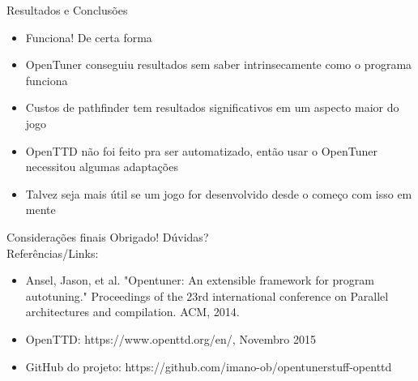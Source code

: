 \documentclass[10pt]{beamer}
\begin{document}
\begin{frame}{Resultados e Conclusões}
	\begin{itemize}
	\item Funciona!  De certa forma\\
	\item OpenTuner conseguiu resultados sem saber intrinsecamente como o programa funciona \\
	\item Custos de pathfinder tem resultados significativos em um aspecto maior do jogo\\
	\item OpenTTD não foi feito pra ser automatizado, então usar o OpenTuner necessitou algumas adaptações\\
	\item Talvez seja mais útil se um jogo for desenvolvido desde o começo com isso em mente
	\end{itemize}
\end{frame}

\begin{frame}{Considerações finais}
	Obrigado! Dúvidas?\\
	Referências/Links:\\
	\begin{itemize}
		\item Ansel, Jason, et al. "Opentuner: An extensible framework for program autotuning." Proceedings of the 23rd international conference on Parallel architectures and compilation. ACM, 2014.
		\item OpenTTD: https://www.openttd.org/en/, Novembro 2015
		\item GitHub do projeto: https://github.com/imano-ob/opentunerstuff-openttd
	\end{itemize}
\end{frame}
\end{document}
